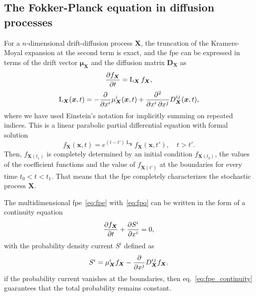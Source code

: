 \documentclass[a4paper,12pt]{book}
\begin{document}
\subsection{The Fokker-Planck equation in diffusion processes}
For a $n$-dimensional drift-diffusion process $\bm{X}$, the truncation of the Kramers-Moyal expansion at the second term is exact, and the \acrshort{fpe} can be expressed in terms of the drift vector $\bm{\mu}_{\bm{X}}$ and the diffusion matrix $\bm{D}_{\bm{X}}$ as
\begin{equation}
    \label{eq:fpe}
    \pdv{f_{\bm{X}}}{t} = \operatorname{L}_{\bm{X}}f_{\bm{X}},
\end{equation}
\begin{equation}
\label{eq:fpo}
     \operatorname{L}_{\bm{X}}(\bm{x},t) = -\pdv{}{x^i}\mu_{\bm{X}}^i(\bm{x},t) + \pdv{}{x^i,x^j} D_{\bm{X}}^{ij}(\bm{x},t),
\end{equation}
where we have used Einstein's notation for implicitly summing on repeated indices. This is a linear parabolic partial differential equation with formal solution
\begin{equation}
    \label{eq:fpe_formal_sol}
    f_{\bm{X}}(\bm{x},t) = e^{(t-t') \operatorname{L}_{\bm{X}}}f_{\bm{X}}(\bm{x},t'), \quad t>t'.
\end{equation}
Then, $f_{\bm{X}(t_1)}$ is completely determined by an initial condition $f_{\bm{X}(t_0)}$, the values of the coefficient functions and the value of $f_{\bm{X}(t')}$ at the boundaries for every time $t_0<t<t_1$. That means that the \acrshort{fpe} completely characterizes the stochastic process $\bm{X}$.

The multidimensional \acrshort{fpe}~\eqref{eq:fpe} with~\eqref{eq:fpo} can be written in the form of a continuity equation
\begin{equation}
    \label{eq:fpe_continuity}
    \pdv{f_{\bm{X}}}{t} + \pdv{S^i}{x^i} = 0,
\end{equation}
with the probability density current $S^i$ defined as
\begin{equation}
    \label{eq:fpe_current}
    S^i = \mu_{\bm{X}}^i f_{\bm{X}} - \pdv{}{x^j}D_{\bm{X}}^{ij}f_{\bm{X}}.
\end{equation}
if the probability current vanishes at the boundaries, then eq.~\eqref{eq:fpe_continuity} guarantees that the total probability remains constant. \\
\end{document}
